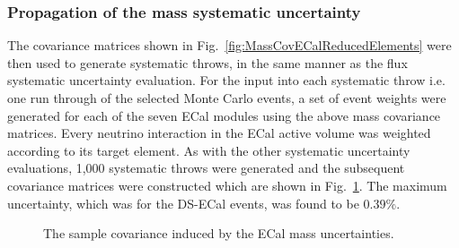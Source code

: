 \subsubsection{Propagation of the mass systematic uncertainty}
\label{subsubsec:ECalMassSystematicPropagation}
The covariance matrices shown in Fig.~\ref{fig:MassCovECalReducedElements} were then used to generate systematic throws, in the same manner as the flux systematic uncertainty evaluation.  For the input into each systematic throw i.e. one run through of the selected Monte Carlo events, a set of event weights were generated for each of the seven ECal modules using the above mass covariance matrices.  Every neutrino interaction in the ECal active volume was weighted according to its target element.  As with the other systematic uncertainty evaluations, 1,000 systematic throws were generated and the subsequent covariance matrices were constructed which are shown in Fig.~\ref{fig:ECalMassCovarianceMatrices}.  The maximum uncertainty, which was for the DS-ECal events, was found to be $0.39\%$. 
\begin{figure}%
  \centering
  \caption{The sample covariance induced by the ECal mass uncertainties.}
  \label{fig:ECalMassCovarianceMatrices}
\end{figure}
